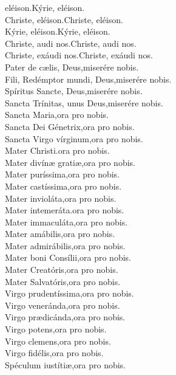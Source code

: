eléison.{\hfill}Kýrie, eléison.\\
Christe, eléison.{\hfill}Christe, eléison.\\
Kýrie, eléison.{\hfill}Kýrie, eléison.\\
Christe, audi nos.{\hfill}Christe, audi nos.\\
Christe, exáudi nos.{\hfill}Christe, exáudi nos.\\
Pater de c{\ae}lis, Deus,{\hfill}miserére nobis.\\
Fili, Redémptor mundi, Deus,{\hfill}miserére nobis.\\
Spíritus Sancte, Deus,{\hfill}miserére nobis.\\
Sancta Trínitas, unus Deus,{\hfill}miserére nobis.\\
Sancta Maria,{\hfill}ora pro nobis.\\
Sancta Dei Génetrix,{\hfill}ora pro nobis.\\
Sancta Virgo vírginum,{\hfill}ora pro nobis.\\
Mater Christi.{\hfill}ora pro nobis.\\
Mater divín{\ae} grati{\ae},{\hfill}ora pro nobis.\\
Mater puríssima,{\hfill}ora pro nobis.\\
Mater castíssima,{\hfill}ora pro nobis.\\
Mater invioláta,{\hfill}ora pro nobis.\\
Mater intemeráta.{\hfill}ora pro nobis.\\
Mater immaculáta,{\hfill}ora pro nobis.\\
Mater amábilis,{\hfill}ora pro nobis.\\
Mater admirábilis,{\hfill}ora pro nobis.\\
Mater boni Consílii,{\hfill}ora pro nobis.\\
Mater Creatóris,{\hfill}ora pro nobis.\\
Mater Salvatóris,{\hfill}ora pro nobis.\\
Virgo prudentíssima,{\hfill}ora pro nobis.\\
Virgo veneránda,{\hfill}ora pro nobis.\\
Virgo pr{\ae}dicánda,{\hfill}ora pro nobis.\\
Virgo potens,{\hfill}ora pro nobis.\\
Virgo clemens,{\hfill}ora pro nobis.\\
Virgo fidélis,{\hfill}ora pro nobis.\\
Spéculum iustíti{\ae},{\hfill}ora pro nobis.\\
